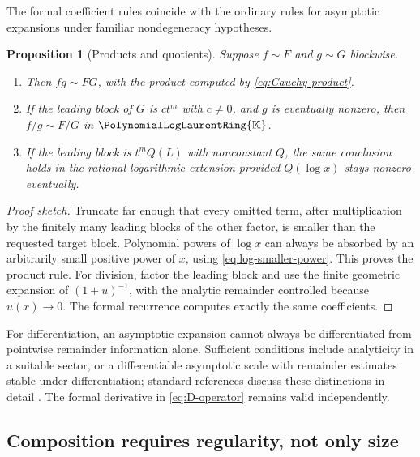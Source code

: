 \documentclass[11pt]{article}
\theoremstyle{pltheorem}
\newtheorem{proposition}[theorem]{Proposition}
\newcommand{\K}{\mathbb K}
\newcommand{\PLL}{\PolynomialLogLaurentRing{\K}}
\begin{document}
The formal coefficient rules coincide with the ordinary rules for asymptotic expansions under familiar nondegeneracy hypotheses.

\begin{proposition}[Products and quotients]\label{prop:asymptotic-product-quotient}
Suppose \(f\sim F\) and \(g\sim G\) blockwise.
\begin{enumerate}[label=\textup{(\roman*)}]
\item Then \(fg\sim FG\), with the product computed by
\cref{eq:Cauchy-product}.
\item If the leading block of \(G\) is \(ct^m\) with \(c\ne0\), and \(g\) is eventually nonzero, then
\(f/g\sim F/G\) in \(\PLL\).
\item If the leading block is \(t^mQ(L)\) with nonconstant \(Q\), the same conclusion holds in the rational-logarithmic extension provided \(Q(\log x)\) stays nonzero eventually.
\end{enumerate}
\end{proposition}

\begin{proof}[Proof sketch]
Truncate far enough that every omitted term, after multiplication by the finitely many leading blocks of the other factor, is smaller than the requested target block.  Polynomial powers of \(\log x\) can always be absorbed by an arbitrarily small positive power of \(x\), using \cref{eq:log-smaller-power}.  This proves the product rule.  For division, factor the leading block and use the finite geometric expansion of
\((1+u)^{-1}\), with the analytic remainder controlled because \(u(x)\to0\).  The formal recurrence computes exactly the same coefficients.
\end{proof}

For differentiation, an asymptotic expansion cannot always be differentiated from pointwise remainder information alone.  Sufficient conditions include analyticity in a suitable sector, or a differentiable asymptotic scale with remainder estimates stable under differentiation; standard references discuss these distinctions in detail \cite{olver-asymptotics,debruijn}.  The formal derivative in \cref{eq:D-operator} remains valid independently.

\subsection{Composition requires regularity, not only size}
\end{document}
